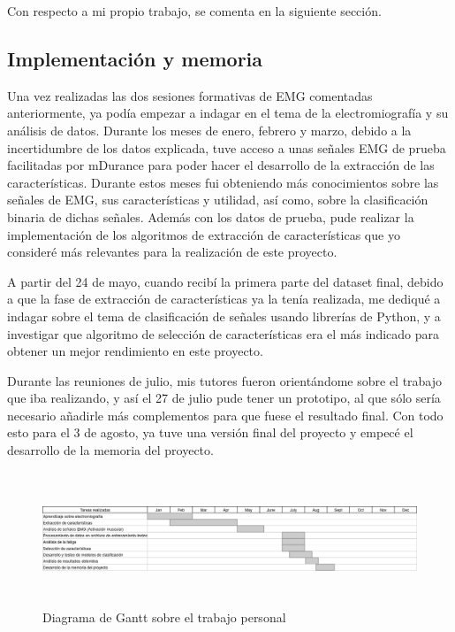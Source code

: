 Con respecto a mi propio trabajo, se comenta en la siguiente sección. 

\subsection{Implementación y memoria}

Una vez realizadas las dos sesiones formativas de EMG comentadas anteriormente, ya podía empezar a indagar en el tema de la electromiografía y su análisis de datos. Durante los meses de enero, febrero y marzo, debido a la incertidumbre de los datos explicada, tuve acceso a unas señales EMG de prueba facilitadas por mDurance para poder hacer el desarrollo de la extracción de las características. Durante estos meses fui obteniendo más conocimientos sobre las señales de EMG, sus características y utilidad, así como, sobre la clasificación binaria de dichas señales. Además con los datos de prueba, pude realizar la implementación de los algoritmos de extracción de características que yo consideré más relevantes para la realización de este proyecto.

A partir del 24 de mayo, cuando recibí la primera parte del dataset final, debido a que la fase de extracción de características ya la tenía realizada, me dediqué a indagar sobre el tema de clasificación de señales usando librerías de Python, y a investigar que algoritmo de selección de características era el más indicado para obtener un mejor rendimiento en este proyecto.

Durante las reuniones de julio, mis tutores fueron orientándome sobre el trabajo que iba realizando, y así el 27 de julio pude tener un prototipo, al que sólo sería necesario añadirle más complementos para que fuese el resultado final. Con todo esto para el 3 de agosto, ya tuve una versión final del proyecto y empecé el desarrollo de la memoria del proyecto.


\begin{figure}[ht]
\centering
\includegraphics[width=1.0\textwidth,height=4cm]{imagenes/tareas realizadas.png}
\caption{ Diagrama de Gantt sobre el trabajo personal }
\label{fig:gantt}
\end{figure}



